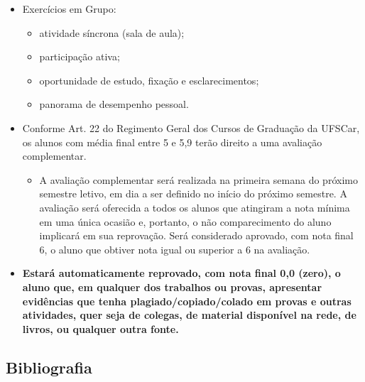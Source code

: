 \begin{frame}[allowframebreaks]{\insertsubsection}
\begin{itemize}
		\item Exercícios em Grupo:
		\begin{itemize}
		    \item atividade síncrona (sala de aula);
		    \item participação ativa;
		    \item oportunidade de estudo, fixação e esclarecimentos;
		    \item panorama de desempenho pessoal.
		\end{itemize}
	\framebreak
		\item Conforme Art. 22 do Regimento Geral dos Cursos de Graduação da UFSCar, os alunos com média final entre 5 e 5,9 terão direito a uma avaliação complementar. 
		\begin{itemize}
			\item A avaliação complementar será realizada na primeira semana do próximo semestre letivo, em dia a ser definido no início do próximo semestre. A avaliação será oferecida a todos os alunos que atingiram a nota mínima em uma única ocasião e, portanto, o não comparecimento do aluno implicará em sua reprovação. Será considerado aprovado, com nota final 6, o aluno que obtiver nota igual ou superior a 6 na avaliação. 
		\end{itemize}
	\framebreak
        \item \textbf{\Large Estará automaticamente reprovado, com nota final 0,0 (zero), o aluno que, em qualquer dos trabalhos ou provas, apresentar evidências que tenha plagiado/copiado/colado em provas e outras atividades, quer seja de colegas, de material disponível na rede, de livros, ou qualquer outra fonte. }
	\end{itemize}
\end{frame}

\subsection{Bibliografia} %

